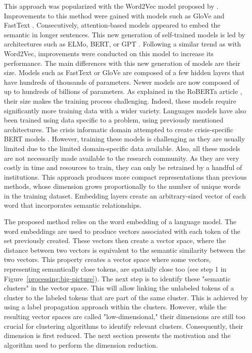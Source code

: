 This approach was popularized with the Word2Vec model proposed by \textcite{mikolovDistributedRepresentationsWords2013}.
Improvements to this method were gained with models such as GloVe and FastText \parencite{bojanowskiEnrichingWordVectors2016,penningtonGloveGlobalVectors2014}.
Consecutively, attention-based models appeared to embed the semantic in longer sentences.
This new generation of self-trained models is led by architectures such as ELMo, BERT, or GPT \parencite{devlinBERTPretrainingDeep2018,petersDeepContextualizedWord2018}.
Following a similar trend as with Word2Vec, improvements were conducted on this model to increase its performance.
The main differences with this new generation of models are their size.
Models such as FastText or GloVe are composed of a few hidden layers that have hundreds of thousands of parameters.
Newer models are now composed of up to hundreds of billions of parameters.
As explained in the RoBERTa article \parencite{liuRoBERTaRobustlyOptimized2019}, their size makes the training process challenging.
Indeed, these models require significantly more training data with a wider variety.
Languages models have also been trained using data specific to a problem, using previously mentioned architectures.
The crisis informatic domain attempted to create crisis-specific BERT models \parencite{liuCrisisBERTRobustTransformer2021}.
However, training these models is challenging as they are usually limited due to the limited domain-specific data available.
Also, all these models are not necessarily made available to the research community.
As they are very costly in time and resources to train, they can only be retrained by a handful of institutions.
This approach produces more compact representations than previous methods, whose dimension grows proportionally to the number of unique words in the training dataset.
Embedding layers create an arbitrary-sized vector of each word that incorporates semantic relationships.

The proposed method relies on the word embedding of a language model.
The word embeddings are used to produce vectors associated with each token of the set previously created.
These vectors then create a vector space, where the distance between two vectors is equivalent to the semantic similarity between the two vectors.
This property creates a vector space where some vectors, representing semantically close tokens, are spatially close too (see step 1 in Figure~\ref{processing:big-picture}).
The next step is to identify these "semantic clusters" in the vector space.
This will allow linking the unlabeled tokens of a cluster to the labeled tokens that are part of the same cluster.
This is achieved by using a label propagation approach within the clusters.
However, while the resulting vector spaces are called "low-dimensional," their dimensions are still too crucial for clustering algorithms to identify relevant clusters.
Consequently, their dimension is first reduced.
The next section presents the motivation and the algorithm used to perform the dimension reduction.

